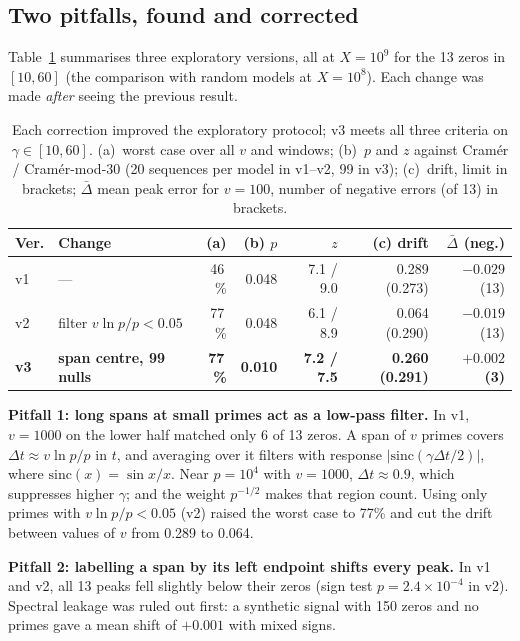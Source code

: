 \documentclass[11pt,a4paper]{article}
\newcommand{\para}[1]{\textsf{\bfseries #1}\hspace{0.45em}}
\begin{document}
\subsection{Two pitfalls, found and corrected}\label{sec:pitfalls}

Table~\ref{tab:versions} summarises three exploratory versions, all at $X=10^9$ for the 13 zeros in $[10,60]$ (the comparison with random models at $X=10^8$). Each change was made \emph{after} seeing the previous result.

\begin{table}[h]
\caption{Each correction improved the exploratory protocol; v3 meets all three criteria on $\gamma\in[10,60]$. (a)~worst case over all $v$ and windows; (b)~$p$ and $z$ against Cramér / Cramér-mod-30 (20 sequences per model in v1--v2, 99 in v3); (c)~drift, limit in brackets; $\bar\Delta$ mean peak error for $v=100$, number of negative errors (of 13) in brackets.}
\label{tab:versions}
\centering\sffamily\small
\begin{tabular}{@{}l>{\raggedright\arraybackslash}p{2.6cm}rrrrr@{}}
\toprule
Ver. & Change & (a) & (b) $p$ & $z$ & (c) drift & $\bar\Delta$ (neg.)\\
\midrule
v1 & --- & 46\,\% & 0.048 & 7.1 / 9.0 & 0.289 (0.273) & $-0.029$ (13)\\[2pt]
v2 & filter $v\ln p/p<0.05$ & 77\,\% & 0.048 & 6.1 / 8.9 & 0.064 (0.290) & $-0.019$ (13)\\[2pt]
\textbf{v3} & \textbf{span centre, 99 nulls} & \textbf{77\,\%} & \textbf{0.010} & \textbf{7.2 / 7.5} & \textbf{0.260 (0.291)} & $\boldsymbol{+0.002}$ \textbf{(3)}\\
\bottomrule
\end{tabular}
\end{table}

\para{Pitfall 1: long spans at small primes act as a low-pass filter.} In v1, $v=1000$ on the lower half matched only 6 of 13 zeros. A span of $v$ primes covers $\Delta t\approx v\ln p/p$ in $t$, and averaging over it filters with response $|\mathrm{sinc}(\gamma\Delta t/2)|$, where $\mathrm{sinc}(x)=\sin x/x$. Near $p=10^4$ with $v=1000$, $\Delta t\approx0.9$, which suppresses higher $\gamma$; and the weight $p^{-1/2}$ makes that region count. Using only primes with $v\ln p/p<0.05$ (v2) raised the worst case to 77\% and cut the drift between values of $v$ from 0.289 to 0.064.

\para{Pitfall 2: labelling a span by its left endpoint shifts every peak.} In v1 and v2, all 13 peaks fell slightly below their zeros (sign test $p=2.4\times10^{-4}$ in v2). Spectral leakage was ruled out first: a synthetic signal with 150 zeros and no primes gave a mean shift of $+0.001$ with mixed signs.
\end{document}
